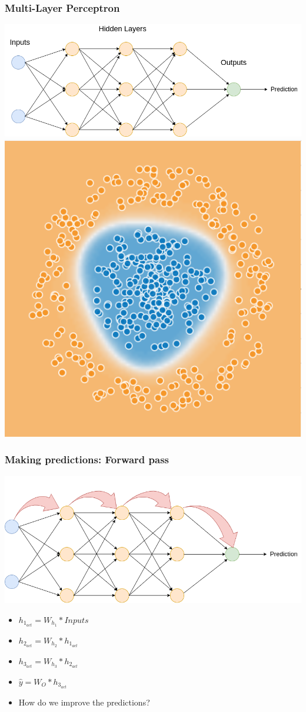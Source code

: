 \begin{frame}
    \frametitle{Multi-Layer Perceptron}
    \center\includegraphics[width=.8\textwidth]{Images/mlp.png}
    \center\includegraphics[width=.3\textwidth]{Images/circles_solved.png}
\end{frame}

\begin{frame}
    \frametitle{Making predictions: Forward pass}
    \center\includegraphics[width=.8\textwidth]{Images/forward_pass.png}
    \begin{itemize}
        \item $h_{1_{act}} = W_{h_1} * Inputs$
        \item $h_{2_{act}} = W_{h_2} * h_{1_{act}}$
        \item $h_{3_{act}} = W_{h_3} * h_{2_{act}}$
        \item $\hat{y} = W_{O} * h_{3_{act}}$
        \item How do we improve the predictions?
    \end{itemize}
\end{frame}

